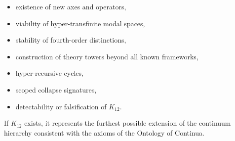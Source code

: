 \begin{itemize}
    \item existence of new axes and operators,
    \item viability of hyper-transfinite modal spaces,
    \item stability of fourth-order distinctions,
    \item construction of theory towers beyond all known frameworks,
    \item hyper-recursive cycles,
    \item scoped collapse signatures,
    \item detectability or falsification of $K_{12}$.
\end{itemize}

If $K_{12}$ exists, it represents the furthest possible extension of 
the continuum hierarchy consistent with the axioms of the Ontology 
of Continua.
